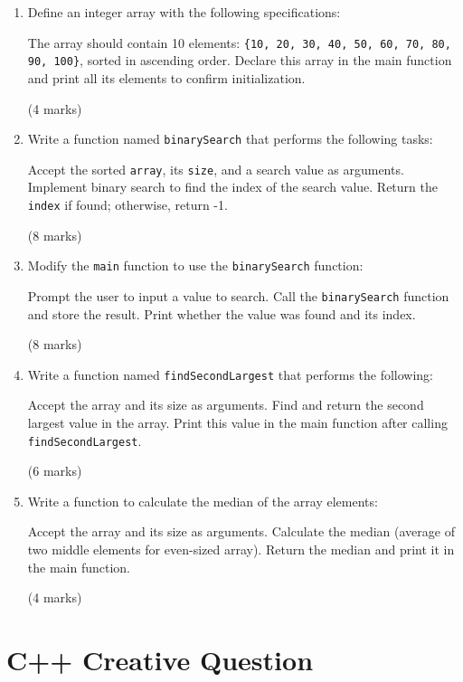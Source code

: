 \documentclass[a4paper,12pt]{article}
\begin{document}
\begin{enumerate}
    \item Define an integer array with the following specifications:

    The array should contain 10 elements: \verb|{10, 20, 30, 40, 50, 60, 70, 80, 90, 100}|, sorted in ascending order.
    Declare this array in the main function and print all its elements to confirm initialization.

    (4 marks)

    \item Write a function named \verb|binarySearch| that performs the following tasks:

    Accept the sorted \verb|array|, its \verb|size|, and a search value as arguments.
    Implement binary search to find the index of the search value.
    Return the \verb|index| if found; otherwise, return -1.

    (8 marks)

    \item Modify the \verb|main| function to use the \verb|binarySearch| function:

    Prompt the user to input a value to search.
    Call the \verb|binarySearch| function and store the result.
    Print whether the value was found and its index.

    (8 marks)

    \item Write a function named \verb|findSecondLargest| that performs the following:

    Accept the array and its size as arguments.
    Find and return the second largest value in the array.
    Print this value in the main function after calling \verb|findSecondLargest|.

    (6 marks)

    \item Write a function to calculate the median of the array elements:

    Accept the array and its size as arguments.
    Calculate the median (average of two middle elements for even-sized array).
    Return the median and print it in the main function.

    (4 marks)
\end{enumerate}

\section{C++ Creative Question}
\end{document}
